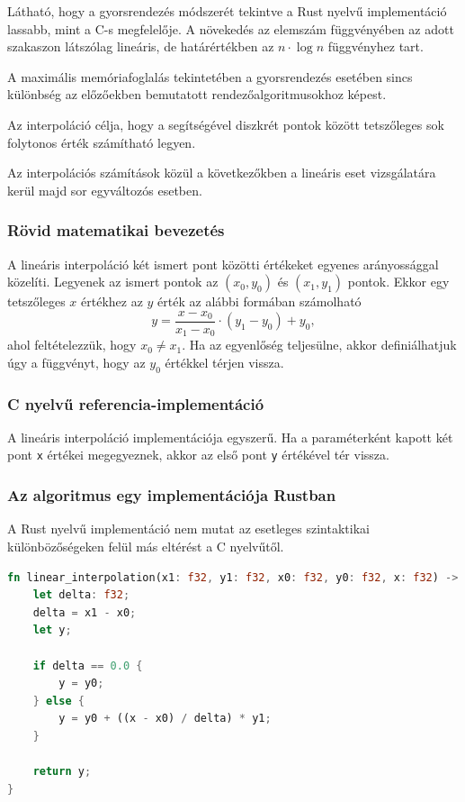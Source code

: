 Látható, hogy a gyorsrendezés módszerét tekintve a Rust nyelvű implementáció lassabb, mint a C-s megfelelője. A növekedés az elemszám függvényében az adott szakaszon látszólag lineáris, de határértékben az $n \cdot \log n$ függvényhez tart.

A maximális memóriafoglalás tekintetében a gyorsrendezés esetében sincs különbség az előzőekben bemutatott rendezőalgoritmusokhoz képest.


Az interpoláció célja, hogy a segítségével diszkrét pontok között tetszőleges sok folytonos érték számítható legyen.


Az interpolációs számítások közül a következőkben a lineáris eset vizsgálatára kerül majd sor egyváltozós esetben.

\subsubsection{Rövid matematikai bevezetés}

A lineáris interpoláció két ismert pont közötti értékeket egyenes arányossággal közelíti. Legyenek az ismert pontok az $(x_0, y_0)$ és $(x_1, y_1)$ pontok. Ekkor egy tetszőleges $x$ értékhez az $y$ érték az alábbi formában számolható
\[ y = \frac{x - x_0}{x_1 - x_0} \cdot (y_1 - y_0) + y_0, \]
ahol feltételezzük, hogy $x_0 \neq x_1$. Ha az egyenlőség teljesülne, akkor definiálhatjuk úgy a függvényt, hogy az $y_0$ értékkel térjen vissza.

\subsubsection{C nyelvű referencia-implementáció}

A lineáris interpoláció implementációja egyszerű. Ha a paraméterként kapott két pont \lstinline{x} értékei megegyeznek, akkor az első pont \lstinline{y} értékével tér vissza.
\subsubsection{Az algoritmus egy implementációja Rustban}
A Rust nyelvű implementáció nem mutat az esetleges szintaktikai különbözőségeken felül más eltérést a C nyelvűtől.
\begin{lstlisting}[language=Rust]
fn linear_interpolation(x1: f32, y1: f32, x0: f32, y0: f32, x: f32) -> f32 {
    let delta: f32;
    delta = x1 - x0;
    let y;

    if delta == 0.0 {
        y = y0;
    } else {
        y = y0 + ((x - x0) / delta) * y1;
    }

    return y;
}
\end{lstlisting}

